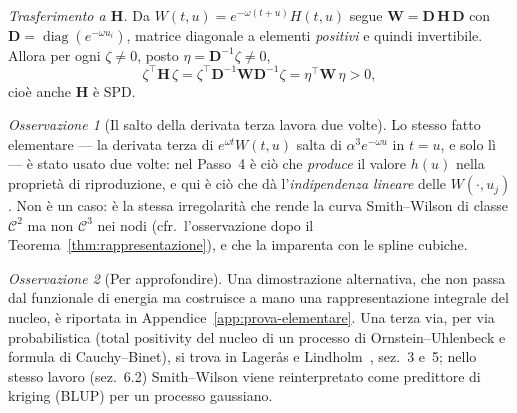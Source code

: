 \documentclass[11pt,a4paper]{article}
\theoremstyle{plain}
\theoremstyle{definition}
\theoremstyle{remark}
\newtheorem*{osservazione}{Osservazione}
\newcommand{\Hmat}{\mathbf{H}}
\newcommand{\transp}{^{\!\top}}
\begin{document}
\emph{Trasferimento a $\Hmat$.} Da $W(t,u)=e^{-\omega(t+u)}H(t,u)$ segue
$\mathbf{W} = \mathbf{D}\,\Hmat\,\mathbf{D}$ con
$\mathbf{D}=\operatorname{diag}(e^{-\omega u_i})$, matrice diagonale a elementi
\emph{positivi} e quindi invertibile. Allora per ogni $\zeta\neq 0$, posto
$\eta = \mathbf{D}^{-1}\zeta \neq 0$,
\[
  \zeta\transp\Hmat\,\zeta
  = \zeta\transp\mathbf{D}^{-1}\mathbf{W}\mathbf{D}^{-1}\zeta
  = \eta\transp\mathbf{W}\,\eta > 0 ,
\]
cio\`e anche $\Hmat$ \`e SPD.

\begin{osservazione}[Il salto della derivata terza lavora due volte]
Lo stesso fatto elementare --- la derivata terza di $e^{\omega t}W(t,u)$ salta di
$\alpha^{3}e^{-\omega u}$ in $t=u$, e solo l\`i --- \`e stato usato due volte: nel Passo~4
\`e ci\`o che \emph{produce} il valore $h(u)$ nella propriet\`a di riproduzione, e qui \`e
ci\`o che d\`a l'\emph{indipendenza lineare} delle $W(\cdot,u_j)$. Non \`e un caso: \`e la
stessa irregolarit\`a che rende la curva Smith--Wilson di classe $\mathcal{C}^2$ ma non
$\mathcal{C}^3$ nei nodi (cfr.\ l'osservazione dopo il
Teorema~\ref{thm:rappresentazione}), e che la imparenta con le spline cubiche.
\end{osservazione}

\begin{osservazione}[Per approfondire]
Una dimostrazione alternativa, che non passa dal funzionale di energia ma costruisce a mano
una rappresentazione integrale del nucleo, \`e riportata in
Appendice~\ref{app:prova-elementare}. Una terza via, per via probabilistica (total positivity
del nucleo di un processo di Ornstein--Uhlenbeck e formula di Cauchy--Binet), si trova in
Lager\aa s e Lindholm~\cite{lageras2016}, sez.~3 e~5; nello stesso lavoro (sez.~6.2)
Smith--Wilson viene reinterpretato come predittore di kriging (BLUP) per un processo
gaussiano.
\end{osservazione}
\end{document}
